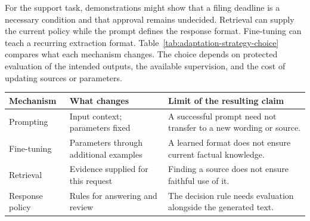 \par\addvspace{\intextsep}\noindent\begin{minipage}{\linewidth}
\centering
{}
\label{fig:prompting-ladder}
\end{minipage}\par\addvspace{\intextsep}

For the support task, demonstrations might show that a filing deadline is a necessary condition and that approval remains undecided. Retrieval can supply the current policy while the prompt defines the response format. Fine-tuning can teach a recurring extraction format. Table~\ref{tab:adaptation-strategy-choice} compares what each mechanism changes. The choice depends on protected evaluation of the intended outputs, the available supervision, and the cost of updating sources or parameters.

\par\addvspace{\intextsep}\noindent\begin{minipage}{\linewidth}
\centering
\setlength{\tabcolsep}{3pt}
\renewcommand{\arraystretch}{1.12}
\begin{tabular}{@{}>{\raggedright\arraybackslash}p{2.1cm}>{\raggedright\arraybackslash}p{3.6cm}>{\raggedright\arraybackslash}p{4.3cm}@{}}
\toprule
Mechanism & What changes & Limit of the resulting claim \\
\midrule
Prompting & Input context; parameters fixed & A successful prompt need not transfer to a new wording or source. \\
Fine-tuning & Parameters through additional examples & A learned format does not ensure current factual knowledge. \\
Retrieval & Evidence supplied for this request & Finding a source does not ensure faithful use of it. \\
Response policy & Rules for answering and review & The decision rule needs evaluation alongside the generated text. \\
\bottomrule
\end{tabular}
\label{tab:adaptation-strategy-choice}
\end{minipage}\par\addvspace{\intextsep}

